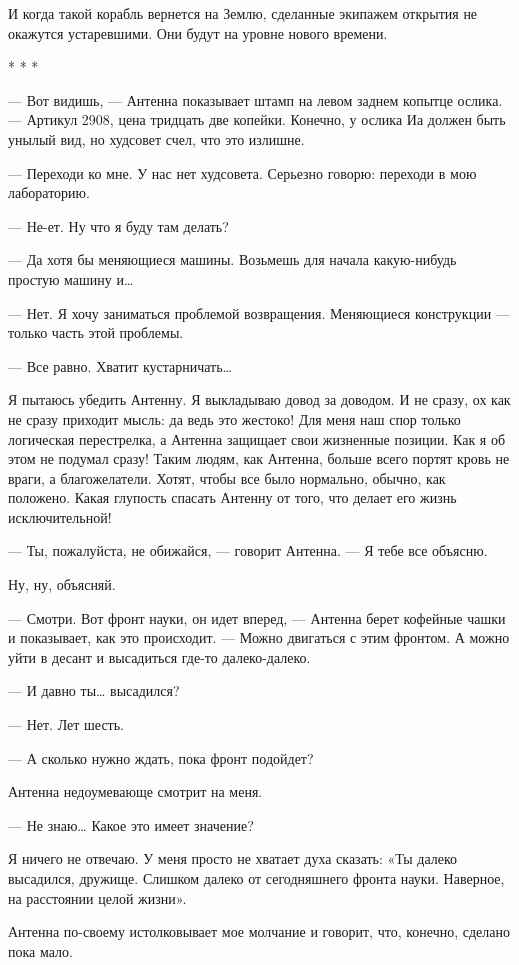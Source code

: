 И когда такой корабль  вернется на Землю,  сделанные экипажем открытия  не
окажутся устаревшими. Они будут на уровне нового времени.

* * *

— Вот видишь, — Антенна показывает штамп на левом заднем копытце ослика. —
Артикул 2908, цена тридцать две копейки. Конечно, у ослика Иа должен  быть
унылый вид, но худсовет счел, что это излишне.

— Переходи ко мне.  У нас нет худсовета.  Серьезно говорю: переходи в  мою
лабораторию.

— Не-ет. Ну что я буду там делать?

— Да хотя бы меняющиеся  машины. Возьмешь для начала какую-нибудь  простую
машину и…

— Нет. Я хочу заниматься  проблемой возвращения. Меняющиеся конструкции  —
только часть этой проблемы.

— Все равно. Хватит кустарничать…

Я пытаюсь убедить Антенну. Я выкладываю  довод за доводом. И не сразу,  ох
как не сразу приходит мысль: да ведь это жестоко! Для меня наш спор только
логическая перестрелка, а Антенна защищает  свои жизненные позиции. Как  я
об этом не подумал  сразу! Таким людям, как  Антенна, больше всего  портят
кровь не враги, а благожелатели. Хотят, чтобы все было нормально,  обычно,
как положено. Какая глупость спасать Антенну от того, что делает его жизнь
исключительной!

— Ты, пожалуйста, не обижайся, — говорит Антенна. — Я тебе все объясню.

Ну, ну, объясняй.

— Смотри. Вот фронт науки, он идет вперед, — Антенна берет кофейные  чашки
и показывает, как  это происходит.  — Можно  двигаться с  этим фронтом.  А
можно уйти в десант и высадиться где-то далеко-далеко.

— И давно ты… высадился?

— Нет. Лет шесть.

— А сколько нужно ждать, пока фронт подойдет?

Антенна недоумевающе смотрит на меня.

— Не знаю… Какое это имеет значение?

Я ничего не  отвечаю. У меня  просто не хватает  духа сказать: «Ты  далеко
высадился, дружище. Слишком далеко от сегодняшнего фронта науки. Наверное,
на расстоянии целой жизни».

Антенна по-своему  истолковывает мое  молчание  и говорит,  что,  конечно,
сделано пока мало.

